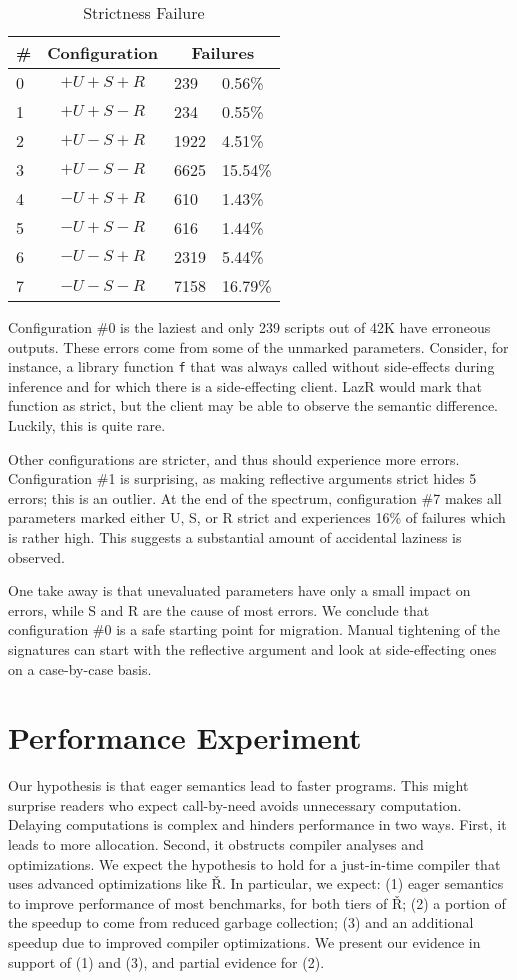\documentclass[review,creen,acmsmall]{acmart}
\renewcommand{\c}[1]{\lstinline |#1|\xspace}
\newcommand{\lazr}{{\sf LazR}\xspace}
\renewcommand{\Rsh}{{\sf\v R}\xspace}
\newcommand{\config}[1]{configuration \#{#1}}
\newcommand{\cconfig}[1]{Configuration \#{#1}}
\begin{document}
\begin{wraptable}{r}{5cm}
  \small
  \caption{Strictness Failure} \label{table:strictfail}
  \centering
  \begin{tabular}{lc|ll}
    \toprule
    \#&\textbf{Configuration}&\multicolumn{2}{c}{\textbf{Failures}}\\
    \midrule
    0&$+U+S+R$&239&0.56\%\\
    1&$+U+S-R$&234&0.55\%\\
    2&$+U-S+R$&1922&4.51\%\\
    3&$+U-S-R$&6625&15.54\%\\
    4&$-U+S+R$&610&1.43\%\\
    5&$-U+S-R$&616&1.44\%\\
    6&$-U-S+R$&2319&5.44\%\\
    7&$-U-S-R$&7158&16.79\%\\
    \bottomrule
  \end{tabular}
\end{wraptable}

\cconfig 0 is the laziest and only 239 scripts out of 42K have erroneous
outputs. These errors come from some of the unmarked parameters. Consider, for
instance, a library function \c f that was always called without side-effects
during inference and for which there is a side-effecting client. \lazr would
mark that function as strict, but the client may be able to observe the semantic
difference. Luckily, this is quite rare.

Other configurations are stricter, and thus should experience more errors.
\cconfig 1 is surprising, as making reflective arguments strict hides 5 errors;
this is an outlier. At the end of the spectrum, \config 7 makes all parameters
marked either U, S, or R strict and experiences 16\% of failures which is rather
high. This suggests a substantial amount of accidental laziness is observed.

One take away is that unevaluated parameters have only a small impact on errors,
while S and R are the cause of most errors. We conclude that \config 0 is a safe
starting point for migration. Manual tightening of the signatures can start with
the reflective argument and look at side-effecting ones on a case-by-case basis.

\section{Performance Experiment}\label{sec:rsh}

Our hypothesis is that eager semantics lead to faster programs. This might
surprise readers who expect call-by-need avoids unnecessary computation.
Delaying computations is complex and hinders performance in two ways. First, it
leads to more allocation. Second, it obstructs compiler analyses and
optimizations. We expect the hypothesis to hold for a just-in-time compiler that
uses advanced optimizations like \Rsh. In particular, we expect: (1) eager
semantics to improve performance of most benchmarks, for both tiers of \Rsh; (2)
a portion of the speedup to come from reduced garbage collection; (3) and an
additional speedup due to improved compiler optimizations. We present our
evidence in support of (1) and (3), and partial evidence for (2).
\end{document}
